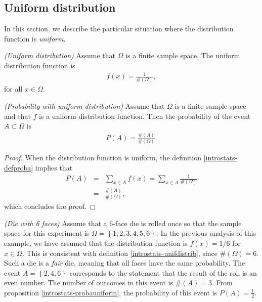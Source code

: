 \subsection{Uniform distribution}

In this section, we describe the particular situation
where the distribution function is \emph{uniform}.

\begin{definition}
\emph{(Uniform distribution)}
\label{introstats-unifdistrib}
Assume that $\Omega$ is a finite sample space.
The uniform distribution function is 
\begin{eqnarray}
\label{introstats-eq-unifdistrib}
f(x) = \frac{1}{\#(\Omega)},
\end{eqnarray}
for all $x\in\Omega$.
\end{definition}

\begin{proposition}
\emph{(Probability with uniform distribution)}
\label{introstats-probauniform}
Assume that $\Omega$ is a finite sample space and 
that $f$ is a uniform distribution function.
Then the probability of the event $A\subset \Omega$ is 
\begin{eqnarray}
P(A) = \frac{\#(A)}{\#(\Omega)}.
\end{eqnarray}
\end{proposition}

\begin{proof}
When the distribution function is uniform, the definition 
\ref{introstats-defproba} implies that 
\begin{eqnarray}
P(A) &=& \sum_{x\in A} f(x) = \sum_{x\in A} \frac{1}{\#(\Omega)} \\
&=& \frac{\#(A)}{\#(\Omega)},
\end{eqnarray}
which concludes the proof. 
\end{proof}

\begin{example}
\emph{(Die with 6 faces)}
\label{introstats-die6faces5}
Assume that a 6-face die is rolled once so that the sample space for this experiment is
$\Omega=\left\{1,2,3,4,5,6\right\}$.
In the previous analysis of this example, we have assumed that the distribution 
function is $f(x)=1/6$ for $x\in\Omega$.
This is consistent with definition \ref{introstats-unifdistrib}, since $\#(\Omega) = 6$.
Such a die is a \emph{fair} die, meaning that all faces have the same probability. 
The event $A=\left\{2,4,6\right\}$ corresponds to the statement that the result of the roll is an even number.
The number of outcomes in this event is $\#(A)=3$.
From proposition \ref{introstats-probauniform}, the probability of this event is $P(A)= \frac{1}{2}$. 
\end{example}

